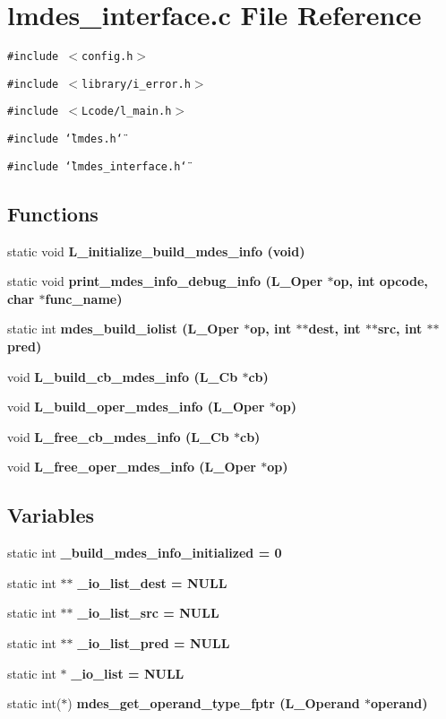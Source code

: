 \section{lmdes\_\-interface.c File Reference}
\label{lmdes__interface_8c}
{\tt \#include $<$config.h$>$}\par
{\tt \#include $<$library/i\_\-error.h$>$}\par
{\tt \#include $<$Lcode/l\_\-main.h$>$}\par
{\tt \#include \char`\"{}lmdes.h\char`\"{}}\par
{\tt \#include \char`\"{}lmdes\_\-interface.h\char`\"{}}\par
\subsection*{Functions}
\begin{CompactItemize}
\item 
static void \bf{L\_\-initialize\_\-build\_\-mdes\_\-info} (void)
\item 
static void \bf{print\_\-mdes\_\-info\_\-debug\_\-info} (L\_\-Oper $\ast$op, int opcode, char $\ast$func\_\-name)
\item 
static int \bf{mdes\_\-build\_\-iolist} (L\_\-Oper $\ast$op, int $\ast$$\ast$dest, int $\ast$$\ast$src, int $\ast$$\ast$pred)
\item 
void \bf{L\_\-build\_\-cb\_\-mdes\_\-info} (L\_\-Cb $\ast$cb)
\item 
void \bf{L\_\-build\_\-oper\_\-mdes\_\-info} (L\_\-Oper $\ast$op)
\item 
void \bf{L\_\-free\_\-cb\_\-mdes\_\-info} (L\_\-Cb $\ast$cb)
\item 
void \bf{L\_\-free\_\-oper\_\-mdes\_\-info} (L\_\-Oper $\ast$op)
\end{CompactItemize}
\subsection*{Variables}
\begin{CompactItemize}
\item 
static int \bf{\_\-build\_\-mdes\_\-info\_\-initialized} = 0
\item 
static int $\ast$$\ast$ \bf{\_\-io\_\-list\_\-dest} = \bf{NULL}
\item 
static int $\ast$$\ast$ \bf{\_\-io\_\-list\_\-src} = \bf{NULL}
\item 
static int $\ast$$\ast$ \bf{\_\-io\_\-list\_\-pred} = \bf{NULL}
\item 
static int $\ast$ \bf{\_\-io\_\-list} = \bf{NULL}
\item 
static int($\ast$) \bf{mdes\_\-get\_\-operand\_\-type\_\-fptr} (L\_\-Operand $\ast$operand)
\end{CompactItemize}


